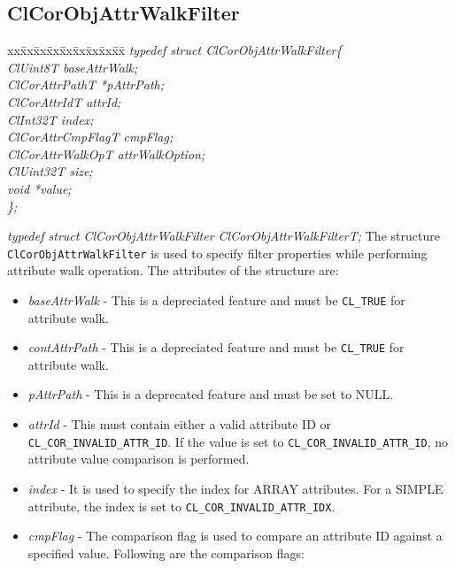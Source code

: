 \begin{flushleft}
\subsection{ClCorObjAttrWalkFilter}
\begin{tabbing}
xx\=xx\=xx\=xx\=xx\=xx\=xx\=xx\=xx\=\kill
\textit{typedef struct ClCorObjAttrWalkFilter\{}\\
\>\>\>\>\textit{ClUint8T              baseAttrWalk;}\\
\>\>\>\>\textit{ClCorAttrPathT       *pAttrPath;}\\
\>\>\>\>\textit{ClCorAttrIdT          attrId;}\\
\>\>\>\>\textit{ClInt32T              index;}\\
\>\>\>\>\textit{ClCorAttrCmpFlagT     cmpFlag;}\\
\>\>\>\>\textit{ClCorAttrWalkOpT      attrWalkOption;}\\
\>\>\>\>\textit{ClUint32T             size;}\\
\>\>\>\>\textit{void                 *value;}\\
\textit{\};}\end{tabbing}
\textit{typedef struct ClCorObjAttrWalkFilter ClCorObjAttrWalkFilterT;}
\newline
\newline
The structure {\tt{ClCorObjAttrWalkFilter}} is used to specify filter properties while performing attribute walk operation. The attributes of the structure 
are:
\begin{itemize}
\item
\textit{baseAttrWalk} - This is a depreciated feature and must be {\tt{CL\_\-TRUE}} for attribute walk.
\item
\textit{contAttrPath} - This is a depreciated feature and must be {\tt{CL\_\-TRUE}} for attribute walk.
\item
\textit{pAttrPath} - This is a deprecated feature and must be set to NULL. 
\item
\textit{attrId} - This must contain either a valid attribute ID or {\tt{CL\_\-COR\_\-INVALID\_\-ATTR\_\-ID}}. If the value is set to 
{\tt{CL\_\-COR\_\-INVALID\_\-ATTR\_\-ID}}, no attribute value comparison is performed. 
\item
\textit{index} - It is used to specify the index for ARRAY attributes. For a SIMPLE attribute, the index is set to {\tt{CL\_\-COR\_\-INVALID\_\-ATTR\_\-IDX}}.
\item
\textit{cmpFlag} - The comparison flag is used to compare an attribute ID against a specified value. Following are the comparison flags:

\end{itemize}
\end{flushleft}
